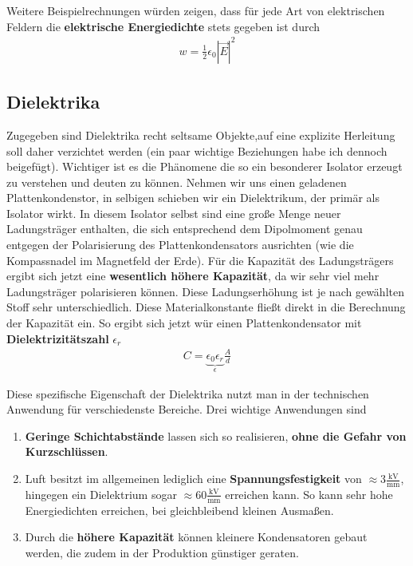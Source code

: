 Weitere Beispielrechnungen  würden zeigen, dass für jede Art von elektrischen Feldern die \textbf{elektrische Energiedichte} stets gegeben ist durch
\begin{align} \label{eqn:Energiedichte}
\boxed{w = \tfrac{1}{2} \epsilon_0 |\vec{E}|^2}
\end{align}


\subsection{Dielektrika}

Zugegeben sind Dielektrika recht seltsame Objekte,auf eine explizite Herleitung soll daher verzichtet werden (ein paar wichtige Beziehungen habe ich dennoch beigefügt). Wichtiger ist es die Phänomene die so ein besonderer Isolator erzeugt  zu verstehen und deuten zu können. 
Nehmen wir uns einen geladenen Plattenkondenstor, in selbigen schieben wir ein Dielektrikum, der primär als Isolator wirkt.
In diesem Isolator selbst sind eine große Menge neuer Ladungsträger enthalten, die sich entsprechend dem Dipolmoment genau entgegen der Polarisierung des Plattenkondensators ausrichten (wie die Kompassnadel im Magnetfeld der Erde).
Für die Kapazität des Ladungsträgers ergibt sich jetzt eine \textbf{wesentlich höhere Kapazität}, da wir sehr viel mehr Ladungsträger polarisieren können.
Diese Ladungserhöhung ist je nach gewählten Stoff sehr unterschiedlich.
Diese Materialkonstante fließt direkt in die Berechnung der Kapazität ein. So ergibt sich jetzt wür einen Plattenkondensator mit \textbf{Dielektrizitätszahl} $\epsilon_r$
\begin{align}\label{eqn:Dielektrikum Plattenkondensator}
C = \underbrace{\epsilon_0 \epsilon_r}_{\epsilon} \frac{A}{d}
\end{align}

Diese spezifische Eigenschaft der Dielektrika nutzt man in der technischen Anwendung für verschiedenste Bereiche. Drei wichtige Anwendungen sind\begin{enumerate}
\item \textbf{Geringe Schichtabstände} lassen sich so realisieren, \textbf{ohne die Gefahr von Kurzschlüssen}.
\item Luft besitzt im allgemeinen lediglich eine \textbf{Spannungsfestigkeit} von $\approx 3\mathrm{\tfrac{kV}{mm}}$, hingegen ein Dielektrium sogar $\approx 60\mathrm{\tfrac{kV}{mm}}$ erreichen kann. So kann  sehr hohe Energiedichten erreichen, bei gleichbleibend kleinen Ausmaßen.
\item  Durch die \textbf{höhere Kapazität} können kleinere Kondensatoren gebaut werden, die zudem in der Produktion günstiger geraten. 
\end{enumerate} \par

